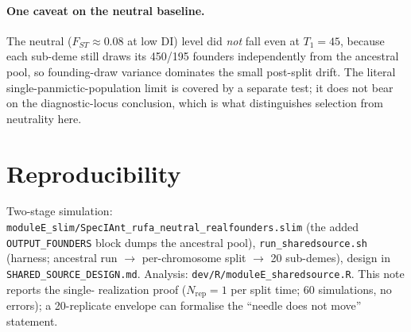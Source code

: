 \documentclass[11pt,a4paper]{article}
\begin{document}
\paragraph{One caveat on the neutral baseline.} The neutral ($F_{ST}\!\approx\!0.08$ at
low DI) level did \emph{not} fall even at $T_1=45$, because each sub-deme still draws
its 450/195 founders independently from the ancestral pool, so founding-draw variance
dominates the small post-split drift. The literal single-panmictic-population limit is
covered by a separate test; it does not bear on the diagnostic-locus conclusion, which
is what distinguishes selection from neutrality here.

\section*{Reproducibility}
Two-stage simulation: \texttt{moduleE\_slim/SpecIAnt\_rufa\_neutral\_realfounders.slim}
(the added \texttt{OUTPUT\_FOUNDERS} block dumps the ancestral pool),
\texttt{run\_sharedsource.sh} (harness; ancestral run $\rightarrow$ per-chromosome
split $\rightarrow$ 20 sub-demes), design in \texttt{SHARED\_SOURCE\_DESIGN.md}.
Analysis: \texttt{dev/R/moduleE\_sharedsource.R}. This note reports the single-
realization proof ($N_{\mathrm{rep}}=1$ per split time; 60 simulations, no errors); a
20-replicate envelope can formalise the ``needle does not move'' statement.
\end{document}
